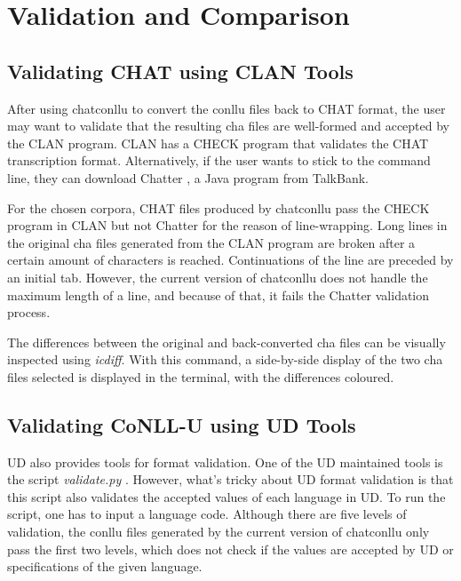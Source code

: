 \chapter{Validation and Comparison} %

\label{Chapter5} %

\section{Validating CHAT using CLAN Tools}

After using chatconllu to convert the conllu files back to CHAT format, the user may want to validate that the resulting cha files are well-formed and accepted by the CLAN program. CLAN has a CHECK program  that validates the CHAT transcription format. Alternatively, if the user wants to stick to the command line, they can download Chatter , a Java program from TalkBank.


For the chosen corpora, CHAT files produced by chatconllu pass the CHECK program in CLAN but not Chatter for the reason of line-wrapping. Long lines in the original cha files generated from the CLAN program are broken after a certain amount of characters is reached. Continuations of the line are preceded by an initial tab. However, the current version of chatconllu does not handle the maximum length of a line, and because of that, it fails the Chatter validation process.

The differences between the original and back-converted cha files can be visually inspected using \emph{icdiff}. With this command, a side-by-side display of the two cha files selected is displayed in the terminal, with the differences coloured.

\section{Validating CoNLL-U using UD Tools}

UD also provides tools for format validation. One of the UD maintained tools is the script \emph{validate.py} . However, what's tricky about UD format validation is that this script also validates the accepted values of each language in UD. To run the script, one has to input a language code. Although there are five levels of validation, the conllu files generated by the current version of chatconllu only pass the first two levels, which does not check if the values are accepted by UD or specifications of the given language.

